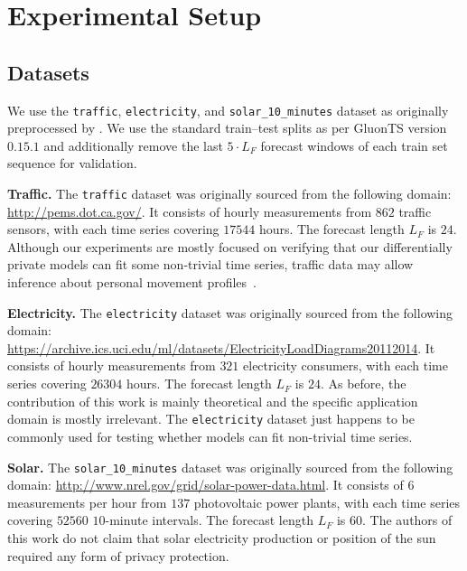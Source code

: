\section{Experimental Setup}\label{appendix:experimental_setup}

\subsection{Datasets}
We use the \texttt{traffic}, \texttt{electricity}, and \texttt{solar\_10\_minutes} dataset 
as originally preprocessed by 
\cite{Lai2018modeling}.
We use the standard train--test splits as per GluonTS version $0.15.1$ and 
 additionally remove the last $5 \cdot L_F$ forecast windows of each train set sequence for validation.

\textbf{Traffic.} The \texttt{traffic} dataset was originally sourced from the following domain: \href{http://pems.dot.ca.gov/}{http://pems.dot.ca.gov/}. It consists of hourly measurements from $862$ traffic sensors, with each time series covering $17544$ hours.
The forecast length $L_F$ is $24$. 
Although our experiments are mostly focused on verifying that our differentially private models can fit some non-trivial time series, 
traffic data may allow inference about personal movement profiles~\cite{giannotti2008mobility}.

\textbf{Electricity.} The \texttt{electricity} dataset was originally sourced from the following domain:
\href{https://archive.ics.uci.edu/ml/datasets/ElectricityLoadDiagrams20112014}{https://archive.ics.uci.edu/ml/datasets/ElectricityLoadDiagrams20112014}. It consists of hourly measurements from $321$ electricity consumers, with each time series covering $26304$ hours.
The forecast length $L_F$ is $24$. 
As before, the contribution of this work is mainly theoretical and the specific application domain is mostly irrelevant. The \texttt{electricity} dataset just happens to be commonly used for testing whether models can fit non-trivial time series.

\textbf{Solar.} The \texttt{solar\_10\_minutes} dataset was originally sourced from the following domain:
\href{http://www.nrel.gov/grid/solar-power-data.html}{http://www.nrel.gov/grid/solar-power-data.html}. It consists of $6$ measurements per hour from $137$ photovoltaic power plants, with each time series covering  $52560$ $10$-minute intervals.
The forecast length $L_F$ is $60$. 
The authors of this work do not claim that solar electricity production or position of the sun required any form of privacy protection.

